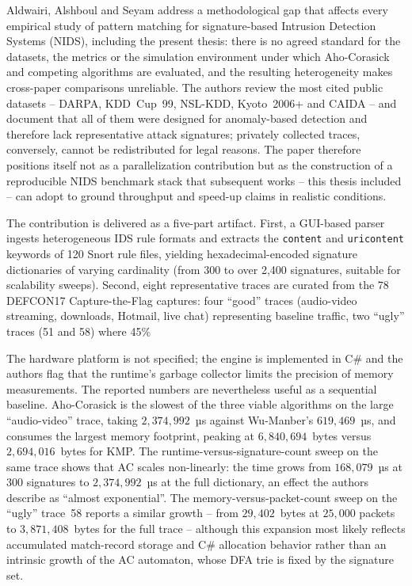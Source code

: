 
Aldwairi, Alshboul and Seyam \cite{Aldwairi2018Characterizing} address a methodological gap that affects every empirical study of pattern matching for signature-based Intrusion Detection Systems (NIDS), including the present thesis: there is no agreed standard for the datasets, the metrics or the simulation environment under which Aho-Corasick and competing algorithms are evaluated, and the resulting heterogeneity makes cross-paper comparisons unreliable. The authors review the most cited public datasets -- DARPA, KDD~Cup~99, NSL-KDD, Kyoto~2006+ and CAIDA -- and document that all of them were designed for anomaly-based detection and therefore lack representative attack signatures; privately collected traces, conversely, cannot be redistributed for legal reasons. The paper therefore positions itself not as a parallelization contribution but as the construction of a reproducible NIDS benchmark stack that subsequent works -- this thesis included -- can adopt to ground throughput and speed-up claims in realistic conditions.

The contribution is delivered as a five-part artifact. First, a GUI-based parser ingests heterogeneous IDS rule formats and extracts the \texttt{content} and \texttt{uricontent} keywords of 120 Snort rule files, yielding hexadecimal-encoded signature dictionaries of varying cardinality (from 300 to over 2{,}400 signatures, suitable for scalability sweeps). Second, eight representative traces are curated from the 78 DEFCON17 Capture-the-Flag captures: four ``good'' traces (audio-video streaming, downloads, Hotmail, live chat) representing baseline traffic, two ``ugly'' traces (51 and 58) where 45\%

The hardware platform is not specified; the engine is implemented in C\# and the authors flag that the runtime's garbage collector limits the precision of memory measurements. The reported numbers are nevertheless useful as a sequential baseline. Aho-Corasick is the slowest of the three viable algorithms on the large ``audio-video'' trace, taking $2{,}374{,}992$~µs against Wu-Manber's $619{,}469$~µs, and consumes the largest memory footprint, peaking at $6{,}840{,}694$~bytes versus $2{,}694{,}016$~bytes for KMP. The runtime-versus-signature-count sweep on the same trace shows that AC scales non-linearly: the time grows from $168{,}079$~µs at $300$ signatures to $2{,}374{,}992$~µs at the full dictionary, an effect the authors describe as ``almost exponential''. The memory-versus-packet-count sweep on the ``ugly'' trace~58 reports a similar growth -- from $29{,}402$~bytes at $25{,}000$ packets to $3{,}871{,}408$~bytes for the full trace -- although this expansion most likely reflects accumulated match-record storage and C\# allocation behavior rather than an intrinsic growth of the AC automaton, whose DFA trie is fixed by the signature set.

